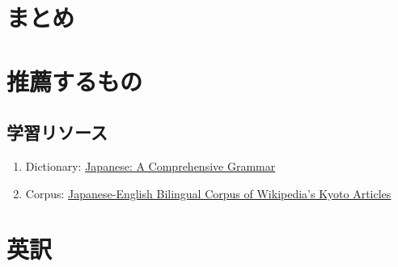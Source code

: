 \documentclass[
uplatex,
b5paper,
10pt,
dvipdfmx
]{jsbook}
\newif\ifEnglish
\newif\ifCHSummary
\begin{document}
\ifCHSummary
\ifEnglish
\chapter{Summary}
\else
\chapter{まとめ}
\fi
\fi

\appendix
 
\chapter{推薦するもの}

\section*{学習リソース}

\begin{enumerate}
 \item Dictionary: \href{https://www.taylorfrancis.com/books/9781136196454}{Japanese: A Comprehensive Grammar}
 \item Corpus: \href{https://alaginrc.nict.go.jp/WikiCorpus/index_E.html}{Japanese-English Bilingual Corpus of Wikipedia's Kyoto Articles}
\end{enumerate}

\chapter{英訳}

\begin{itemize}\small

\end{itemize}


%
\end{document}
